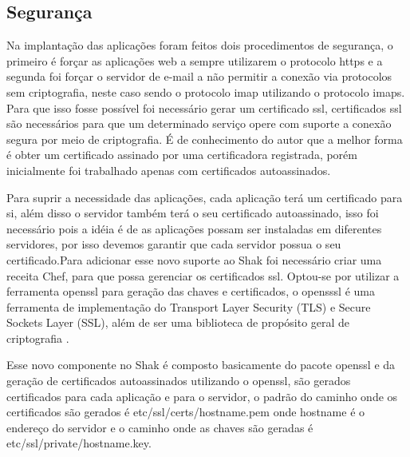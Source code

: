 

\subsection{Segurança}
\label{sub:prototipo}

Na implantação das aplicações foram feitos dois procedimentos de segurança, o primeiro
é forçar as aplicações web a sempre utilizarem o protocolo https e a segunda foi forçar o
servidor de e-mail a não permitir a conexão via protocolos sem criptografia, neste
caso sendo o protocolo imap utilizando o protocolo imaps. Para que isso fosse possível
foi necessário gerar um certificado ssl, certificados ssl são necessários para
que um determinado serviço opere com suporte a conexão segura por meio de criptografia.
É de conhecimento do autor que a melhor forma é obter um certificado assinado
por uma certificadora registrada, porém inicialmente foi trabalhado apenas com certificados
autoassinados.

Para suprir a necessidade das aplicações, cada aplicação terá um certificado para
si, além disso o servidor também terá o seu certificado autoassinado, isso foi necessário
pois a idéia é de as aplicações possam ser instaladas em diferentes servidores, por
isso devemos garantir que cada servidor possua o seu certificado.Para adicionar
esse novo suporte ao Shak foi necessário criar uma receita Chef,
para que possa gerenciar os certificados ssl. Optou-se por utilizar a ferramenta
openssl para geração das chaves e certificados, o opensssl é uma ferramenta de
implementação do Transport Layer Security (TLS) e Secure Sockets Layer (SSL),
além de ser uma biblioteca de propósito geral de criptografia \cite{openssl}.

Esse novo componente no Shak é composto basicamente do pacote openssl e da geração
de certificados autoassinados utilizando o openssl, são gerados certificados
para cada aplicação e para o servidor, o padrão do caminho onde os certificados são
gerados é etc/ssl/certs/hostname.pem onde hostname é o endereço do servidor
e o caminho onde as chaves são geradas é etc/ssl/private/hostname.key.


